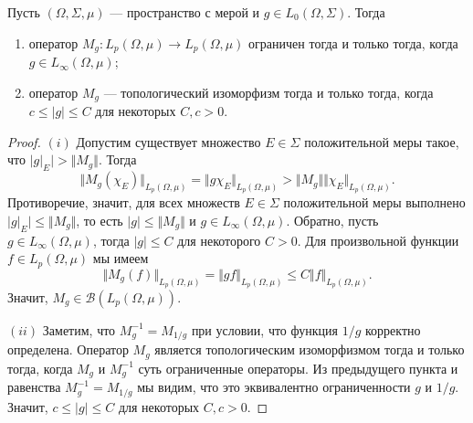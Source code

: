 \begin{proposition}\label{MultpOpPropIfPeqqualsQ} Пусть $(\Omega,\Sigma,\mu)$
--- пространство с мерой и $g\in L_0(\Omega,\Sigma)$. Тогда 

\begin{enumerate}[label = (\roman*)]
    \item оператор $M_g:L_p(\Omega,\mu)\to L_p(\Omega,\mu)$ ограничен 
    тогда и только тогда, когда $g\in L_\infty(\Omega,\mu)$;

    \item оператор $M_g$ --- топологический изоморфизм тогда и только 
    тогда, когда $c\leq |g|\leq C$ для некоторых $C,c>0$.
\end{enumerate}
\end{proposition}
\begin{proof}
$(i)$ Допустим существует множество $E\in\Sigma$ положительной меры такое, что
$|g|_E|>\Vert M_g\Vert$. Тогда
$$
\Vert M_g(\chi_E)\Vert_{L_p(\Omega,\mu)}
=\Vert g\chi_E\Vert_{L_p(\Omega,\mu)}
>\Vert M_g\Vert\Vert\chi_E\Vert_{L_p(\Omega,\mu)}.
$$
Противоречие, значит, для всех множеств $E\in\Sigma$ положительной меры
выполнено $|g|_E|\leq \Vert M_g\Vert$, то есть $|g|\leq \Vert M_g\Vert$ и 
$g\in L_\infty(\Omega,\mu)$. Обратно, пусть $g\in L_\infty(\Omega,\mu)$, тогда
$|g|\leq C$ для некоторого $C>0$. Для произвольной функции 
$f\in L_p(\Omega,\mu)$ мы имеем
$$
\Vert M_g(f)\Vert_{L_p(\Omega,\mu)}
=\Vert g  f\Vert_{L_p(\Omega,\mu)}
\leq C\Vert f\Vert_{L_p(\Omega,\mu)}.
$$
Значит, $M_g\in\mathcal{B}(L_p(\Omega,\mu))$.

$(ii)$ Заметим, что $M_g^{-1}=M_{1/g}$ при условии, что функция $1/g$ корректно
определена. Оператор $M_g$ является топологическим изоморфизмом тогда и только
тогда, когда $M_g$ и $M_g^{-1}$ суть ограниченные операторы. Из предыдущего
пункта и равенства $M_g^{-1}=M_{1/g}$ мы видим, что это эквивалентно
ограниченности $g$ и $1/g$. Значит, $c\leq|g|\leq C$ для некоторых $C,c>0$.
\end{proof}


